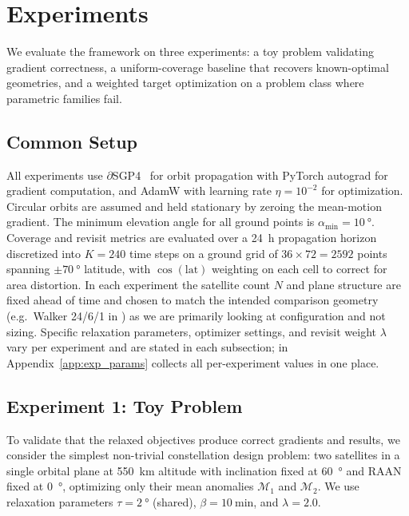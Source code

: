 \section{Experiments}
\label{sec:experiments}

We evaluate the framework on three experiments: a toy problem validating gradient correctness, a uniform-coverage baseline that recovers known-optimal geometries, and a weighted target optimization on a problem class where parametric families fail.

\subsection{Common Setup}
\label{sec:common_setup}

All experiments use $\partial$SGP4~\citep{acciarini_closing_2025} for orbit propagation with PyTorch autograd for gradient computation, and AdamW with learning rate $\eta = 10^{-2}$ for optimization.
Circular orbits are assumed and held stationary by zeroing the mean-motion gradient.
The minimum elevation angle for all ground points is $\alpha_{\min} = \SI{10}{\degree}$.
Coverage and revisit metrics are evaluated over a \SI{24}{\hour} propagation horizon discretized into $K = 240$ time steps on a ground grid of $36 \times 72 = 2592$ points spanning $\pm\SI{70}{\degree}$ latitude, with $\cos(\text{lat})$ weighting on each cell to correct for area distortion.
In each experiment the satellite count $N$ and plane structure are fixed ahead of time and chosen to match the intended comparison geometry (e.g.\ Walker 24/6/1 in ) as we are primarily looking at configuration and not sizing.
Specific relaxation parameters, optimizer settings, and revisit weight $\lambda$ vary per experiment and are stated in each subsection;  in Appendix~\ref{app:exp_params} collects all per-experiment values in one place.

\subsection{Experiment 1: Toy Problem}
\label{sec:toy}
    
To validate that the relaxed objectives produce correct gradients and results, we consider the simplest non-trivial constellation design problem: two satellites in a single orbital plane at \SI{550}{\kilo\metre} altitude with inclination fixed at \SI{60}{\degree} and RAAN fixed at \SI{0}{\degree}, optimizing only their mean anomalies $\mathcal{M}_1$ and $\mathcal{M}_2$.
We use relaxation parameters $\tau = \SI{2}{\degree}$ (shared), $\beta = \SI{10}{\minute}$, and $\lambda = 2.0$.

